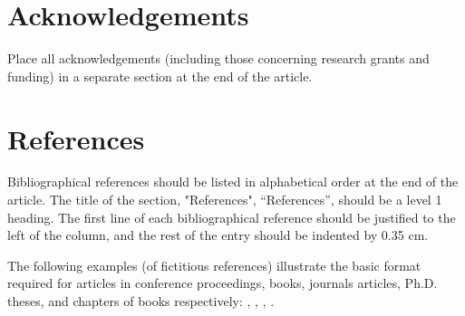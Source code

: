 \documentclass[10pt, a4paper]{article}
\begin{document}
\section{Acknowledgements}

Place all acknowledgements (including those concerning research grants and funding) in a separate section at the end of the article.

\section{References}
Bibliographical references should be listed in alphabetical order at the end of the article. The title of the section, "References", ``References'', should be a level 1 heading. The first line of each bibliographical reference should be justified to the left of the column, and the rest of the entry should be indented by 0.35 cm.

The following examples (of fictitious references) illustrate the basic format required for articles in conference proceedings, books, journals articles, Ph.D. theses, and chapters of books respectively:
\cite{Martin-90},  \cite{Chercheur-94},  \cite{CastorPollux-92}  \cite{Zavatta-92},  \cite{Grandchercheur-83}.




\end{document}
